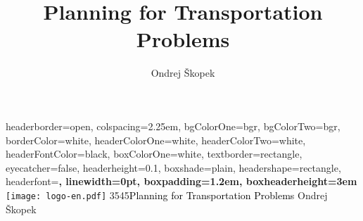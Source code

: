 \documentclass[a0paper,portrait,fontscale=0.2975]{TUTposter} %
\title{Planning for Transportation Problems} %
\author{Ondrej \v{S}kopek} %
\makeatletter
\newcommand\HUGE{\@setfontsize\Huge{35}{45}}
\makeatother
\begin{document}
\begin{poster}
{
headerborder=open, %
colspacing=2.25em, %
bgColorOne=bgr, %
bgColorTwo=bgr, %
borderColor=white, %
headerColorOne=white, %
headerColorTwo=white, %
headerFontColor=black, %
boxColorOne=white, %
textborder=rectangle, %
eyecatcher=false, %
headerheight=0.1\textheight, %
boxshade=plain,
headershape=rectangle, %
headerfont=\hspace{0.2em}\LARGE\bf\textsc, %
linewidth=0pt, %
boxpadding=1.2em,
boxheaderheight=3em
}
%
{\texttt{[image: logo-en.pdf]}} %
{\vspace{0.8em}\hspace{0.5em}\HUGE\textsf{\textcolor{black}{Planning for Transportation Problems}}\vspace{0.3em}%
} %
{%
\LARGE\textsf{Ondrej {\v{S}}kopek}\\%
}


\end{poster}
\end{document}
